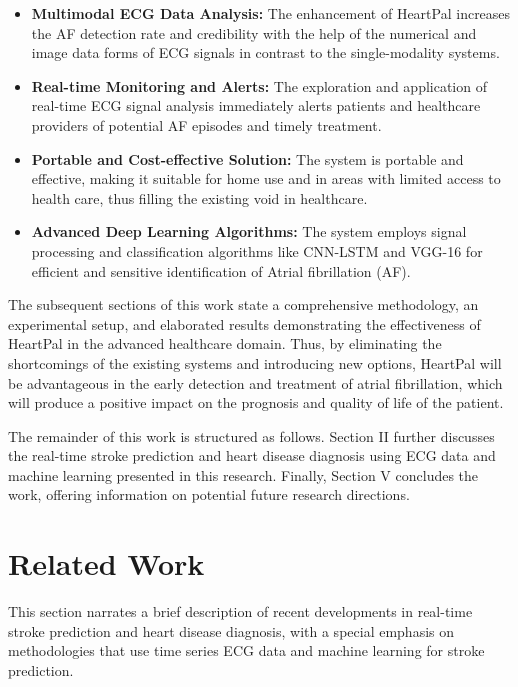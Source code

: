 \documentclass[conference]{IEEEtran}
\begin{document}
\begin{itemize}
    \item \textbf{Multimodal ECG Data Analysis:} The enhancement of HeartPal increases the AF detection rate and credibility with the help of the numerical and image data forms of ECG signals in contrast to the single-modality systems.
    \item \textbf{Real-time Monitoring and Alerts:} The exploration and application of real-time ECG signal analysis immediately alerts patients and healthcare providers of potential AF episodes and timely treatment.
    \item \textbf{Portable and Cost-effective Solution:} The system is portable and effective, making it suitable for home use and in areas with limited access to health care, thus filling the existing void in healthcare.
    \item \textbf{Advanced Deep Learning Algorithms:} The system employs signal processing and classification algorithms like CNN-LSTM and VGG-16 for efficient and sensitive identification of Atrial fibrillation (AF).

\end{itemize}

The subsequent sections of this work state a comprehensive methodology, an experimental setup, and elaborated results demonstrating the effectiveness of HeartPal in the advanced healthcare domain. Thus, by eliminating the shortcomings of the existing systems and introducing new options, HeartPal will be advantageous in the early detection and treatment of atrial fibrillation, which will produce a positive impact on the prognosis and quality of life of the patient.

The remainder of this work is structured as follows. Section II further discusses the real-time stroke prediction and heart disease diagnosis using ECG data and machine learning presented in this research. Finally, Section V concludes the work, offering information on potential future research directions.


\section{Related Work}
This section narrates a brief description of recent developments in real-time stroke prediction and heart disease diagnosis, with a special emphasis on methodologies that use time series ECG data and machine learning for stroke prediction.
\end{document}
